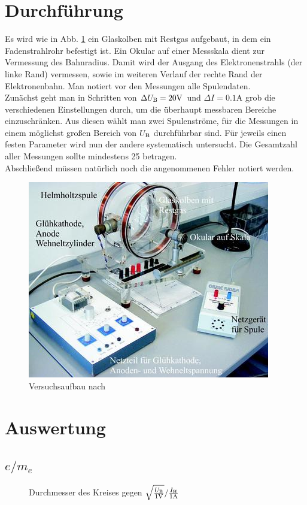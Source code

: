 \documentclass[12pt,a4paper,titlepage,headinclude,bibtotoc]{scrartcl}
\numberwithin{equation}{section}
\begin{document}
\newpage
\section{Durchführung}
\label{sec:durchfuehrung}
Es wird wie in Abb. \ref{fig:aufbau} ein Glaskolben mit Restgas aufgebaut, in dem ein Fadenstrahlrohr befestigt ist.
Ein Okular auf einer Messskala dient zur Vermessung des Bahnradius.
Damit wird der Ausgang des Elektronenstrahls (der linke Rand) vermessen, sowie im weiteren Verlauf der rechte Rand der Elektronenbahn.
Man notiert vor den Messungen alle Spulendaten.\\
Zunächst geht man in Schritten von $\Delta U_\text B=20\si{\volt}$ und $\Delta I=0.1\si{\ampere}$ grob die verschiedenen Einstellungen durch, um die überhaupt messbaren Bereiche einzuschränken.
Aus diesen wählt man zwei Spulenströme, für die Messungen in einem möglichst großen Bereich von $U_\text B$ durchführbar sind.
Für jeweils einen festen Parameter wird nun der andere systematisch untersucht.
Die Gesamtzahl aller Messungen sollte mindestens 25 betragen.\\
Abschließend müssen natürlich noch die angenommenen Fehler notiert werden.

\begin{figure}[!h]
	\centering
	\includegraphics[width=0.7\linewidth]{aufbau}
	\caption{Versuchsaufbau nach \cite{LP}}
	\label{fig:aufbau}
\end{figure}


\section{Auswertung}
\label{sec:auswertung}
\subsection{$e/m_e$}
\begin{figure}[!h]
	\centering
	\caption{Durchmesser des Kreises gegen $\sqrt{\frac{U_\text{B}}{1\text V}}/\frac{I_\text{H}}{1\text A}$}
	\label{fig:UI}
\end{figure}
\end{document}
